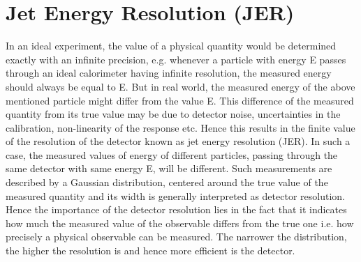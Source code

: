 \section{Jet Energy Resolution (JER)}
\label{sec:Resolution}
In an ideal experiment, the value of a physical quantity would be determined exactly with an infinite precision, e.g. whenever a particle with energy E passes through an ideal calorimeter having infinite resolution, the measured energy should always be equal to E. But in real world, the measured energy of the above mentioned particle might differ from the value E. This difference of the measured quantity from its true value may be due to detector noise, uncertainties in the calibration, non-linearity of the response etc. Hence this results in the finite value of the resolution of the detector known as jet energy resolution (JER). In such a case, the measured values of energy of different particles, passing through the same detector with same energy E, will be different. Such measurements are described by a Gaussian distribution, centered around the true value of the measured quantity and its width is generally interpreted as detector resolution. Hence the importance of the detector resolution lies in the fact that it indicates how much the measured value of the observable differs from the true one i.e. how precisely a physical observable can be measured. The narrower the distribution, the higher the resolution is and hence more efficient is the detector. %

